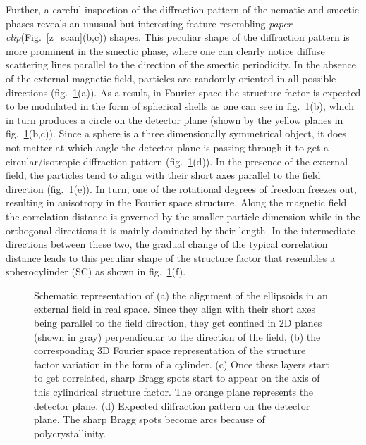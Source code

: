 \documentclass[aps,prl,preprint,superscriptaddress,showkeys]{revtex4-2} %
\begin{document}
Further, a careful inspection of the diffraction pattern of the nematic and smectic phases reveals an unusual but interesting feature resembling \textit{paper-clip}(Fig.~\ref{z_scan}(b,c)) shapes. This peculiar shape of the diffraction pattern is more prominent in the smectic phase, where one can clearly notice diffuse scattering lines parallel to the direction of the smectic periodicity. In the absence of the external magnetic field, particles are randomly oriented in all possible directions (fig.~\ref{Fspace_smectic}(a)). As a result, in Fourier space the structure factor is expected to be modulated in the form of spherical shells as one can see in fig.~\ref{Fspace_smectic}(b), which in turn produces a circle on the detector plane (shown by the yellow planes in fig.~\ref{Fspace_smectic}(b,c)). Since a sphere is a three dimensionally symmetrical object, it does not matter at which angle the detector plane is passing through it to get a circular/isotropic diffraction pattern (fig.~\ref{Fspace_smectic}(d)). In the presence of the external field, the particles tend to align with their short axes parallel to the field direction (fig.~\ref{Fspace_smectic}(e)). In turn, one of the rotational degrees of freedom freezes out, resulting in anisotropy in the Fourier space structure. Along the magnetic field the correlation distance is governed by the smaller particle dimension while in the orthogonal directions it is mainly dominated by their length. In the intermediate directions between these two, the gradual change of the typical correlation distance leads to this peculiar shape of the structure factor that resembles a spherocylinder (SC) as shown in fig.~\ref{Fspace_smectic}(f). %
\begin{figure}[ht]
\caption{Schematic representation of (a) the alignment of the ellipsoids in an external field in real space. Since they align with their short axes being parallel to the field direction, they get confined in 2D planes (shown in gray) perpendicular to the direction of the field, (b) the corresponding 3D Fourier space representation of the structure factor variation in the form of a cylinder. (c) Once these layers start to get correlated, sharp Bragg spots start to appear on the axis of this cylindrical structure factor. The orange plane represents the detector plane. (d) Expected diffraction pattern on the detector plane. The sharp Bragg spots become arcs because of polycrystallinity.}\label{Fspace_smectic}
\end{figure} 
\end{document}
